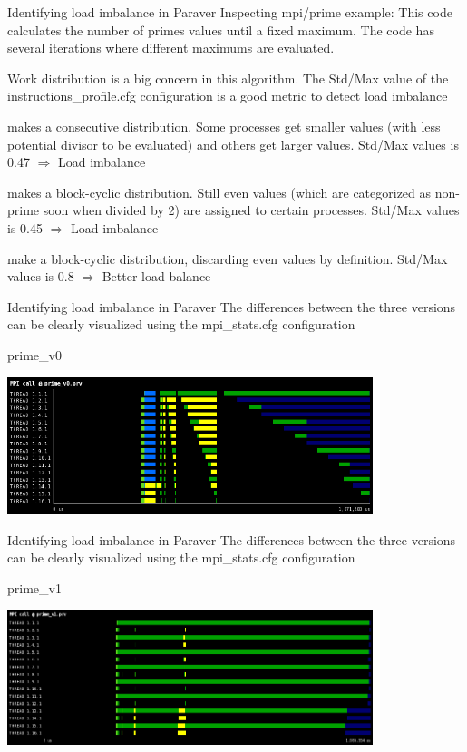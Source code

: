 \documentclass[10pt,xcolor=table]{beamer}
\begin{document}
\begin{frame}{Identifying load imbalance in Paraver}
Inspecting mpi/prime example: This code calculates the number of primes values until a fixed maximum. The code has several iterations where different maximums are evaluated.

Work distribution is a big concern in this algorithm. The Std/Max value of the instructions\_profile.cfg configuration is a good metric to detect load imbalance
\begin{description}
\footnotesize
\item[prime\_v0] makes a consecutive distribution. Some processes get smaller values (with less potential divisor to be evaluated) and others get larger values. Std/Max values is 0.47 $\Rightarrow$ Load imbalance
\item[prime\_v1] makes a block-cyclic distribution. Still even values (which are categorized as non-prime soon when divided by 2) are assigned to certain processes.  Std/Max values is 0.45 $\Rightarrow$ Load imbalance
\item[prime\_v2] make a block-cyclic distribution, discarding even values by definition.  Std/Max values is 0.8 $\Rightarrow$ Better load balance
\end{description}
\end{frame}

\begin{frame}{Identifying load imbalance in Paraver}
The differences between the three versions can be clearly visualized using the mpi\_stats.cfg configuration

\centering
prime\_v0

\includegraphics[width=0.8\textwidth]{figs/MPI_call@prime_v0.png}

    
\end{frame}

\begin{frame}{Identifying load imbalance in Paraver}
The differences between the three versions can be clearly visualized using the mpi\_stats.cfg configuration

\centering
prime\_v1

\includegraphics[width=0.8\textwidth]{figs/MPI_call@prime_v1.png}

    
\end{frame}
\end{document}
